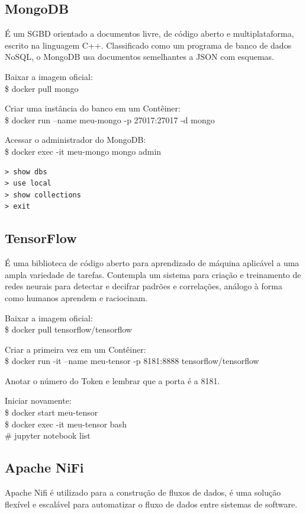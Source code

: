 \documentclass[a4paper,11pt]{article}
\begin{document}
\subsection{MongoDB}
É um SGBD orientado a documentos livre, de código aberto e multiplataforma, escrito na linguagem C++. Classificado como um programa de banco de dados NoSQL, o MongoDB usa documentos semelhantes a JSON com esquemas. 

Baixar a imagem oficial: \\
{\ttfamily\$ docker pull mongo}

Criar uma instância do banco em um Contêiner: \\
{\ttfamily\$ docker run --name meu-mongo -p 27017:27017 -d mongo}

Acessar o administrador do MongoDB: \\
{\ttfamily\$ docker exec -it meu-mongo mongo admin}
\begin{lstlisting}
> show dbs
> use local
> show collections
> exit
\end{lstlisting}

\subsection{TensorFlow}
É uma biblioteca de código aberto para aprendizado de máquina aplicável a uma ampla variedade de tarefas. Contempla um sistema para criação e treinamento de redes neurais para detectar e decifrar padrões e correlações, análogo à forma como humanos aprendem e raciocinam. 

Baixar a imagem oficial: \\
{\ttfamily\$ docker pull tensorflow/tensorflow}

Criar a primeira vez em um Contêiner: \\
{\ttfamily\$ docker run -it --name meu-tensor -p 8181:8888 tensorflow/tensorflow}

Anotar o número do Token e lembrar que a porta é a 8181. 

Iniciar novamente: \\
{\ttfamily\$ docker start meu-tensor \\
	\$ docker exec -it meu-tensor bash \\
	\# jupyter notebook list}

\subsection{Apache NiFi}
Apache Nifi é utilizado para a construção de fluxos de dados, é uma solução flexível e escalável para automatizar o fluxo de dados entre sistemas de software. 
\end{document}
